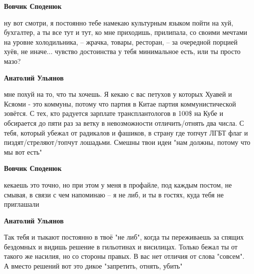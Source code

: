 \begin{itemize}
\begin{itemize}
\textbf{Вовчик Споденюк} 

ну вот смотри, я постоянно тебе намекаю культурным языком пойти на хуй,
бухгалтер, а ты все тут и тут, ко мне приходишь, прилипала, со своими мечтами
на уровне холодильника, – жрачка, товары, ресторан, – за очередной порцией
хуёв, не иначе... чувство достоинства у тебя минимальное есть, или ты просто
мазо?


 
\textbf{Анатолий Ульянов} 

мне похуй на то, что ты хочешь. Я кекаю с вас петухов у которых Хуавей и Ксяоми
- это коммуны, потому что партия в Китае партия коммунистической зовётся. С
тех, кто радуется зарплате трансплантологов в 100\$ на Кубе и обсирается до
пяти раз за ветку в невозможности отличить/отнять два числа. С тебя, который
убежал от радикалов и фашиков, в страну где топчут ЛГБТ флаг и
пиздят/стреляют/топчут лошадьми. Смешны твои идеи "нам должны, потому что мы
вот есть"


 
\textbf{Вовчик Споденюк} 

кекаешь это точно, но при этом у меня в профайле, под каждым постом, не смывая,
в связи с чем напоминаю – я не либ, и ты в гостях, куда тебя не приглашали

 
\textbf{Анатолий Ульянов} 

Так тебя и тыкают постоянно в твоё "не либ", когда ты переживаешь за спящих
бездомных и видишь решение в гильотинах и висилицах. Только бежал ты от такого
же насилия, но со стороны правых. В вас нет отличия от слова "совсем". А вместо
решений вот это дикое "запретить, отнять, убить"


 

\end{itemize}
\end{itemize}
